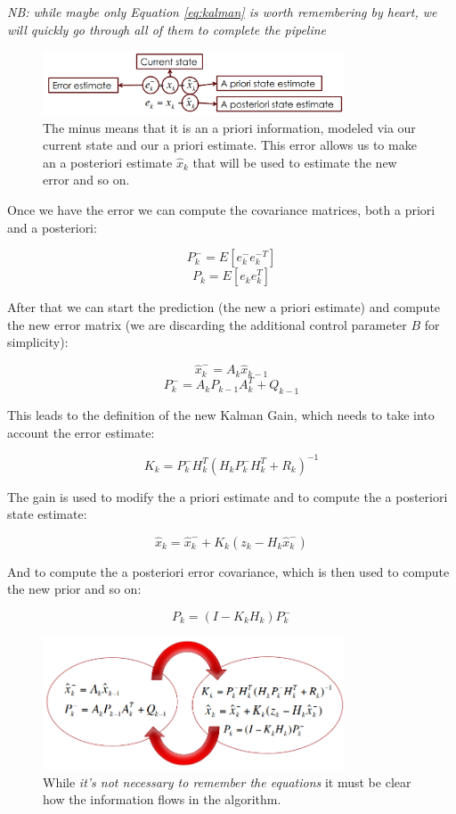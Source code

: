 \textit{NB: while maybe only Equation \ref{eq:kalman} is worth remembering by heart, we will quickly go through all of them to complete the pipeline}
\begin{figure}[H]
    \centering
    \includegraphics[width=0.8\textwidth]{Figures/prior.png}
    \caption{The minus means that it is an a priori information, modeled via our current state and our a priori estimate. This error allows us to make an a posteriori estimate $\hat{x}_k$ that will be used to estimate the new error and so on.}
    \label{img:prior}
\end{figure}

Once we have the error we can compute the covariance matrices, both a priori and a posteriori:

\[
    P^-_k = E[e^-_ke^{-T}_k]
\]
\[
    P_k = E[e_ke^T_k]
\]

After that we can start the prediction (the new a priori estimate) and compute the new error matrix (we are discarding the additional control parameter $B$ for simplicity):

\[
    \hat{x}^-_k = A_k\hat{x}_{k-1}
\]
\[
    P^-_k = A_kP_{k-1}A^T_k+Q_{k-1}
\]

This leads to the definition of the new Kalman Gain, which needs to take into account the error estimate:

\[
    K_k = P^-_kH^T_k(H_kP^-_kH^T_k+R_k)^{-1}    
\]

The gain is used to modify the a priori estimate and to compute the a posteriori state estimate:

\[
    \hat{x}_k = \hat{x}^-_k+K_k(z_k-H_k\hat{x}^-_k)
\]

And to compute the a posteriori error covariance, which is then used to compute the new prior and so on:

\[
    P_k = (I-K_kH_k)P^-_k    
\]

\begin{figure}[H]
    \centering
    \includegraphics[width=0.8\textwidth]{Figures/loop.png}
    \caption{While \textit{it's not necessary to remember the equations} it must be clear how the information flows in the algorithm.}
    \label{img:loop}
\end{figure}

